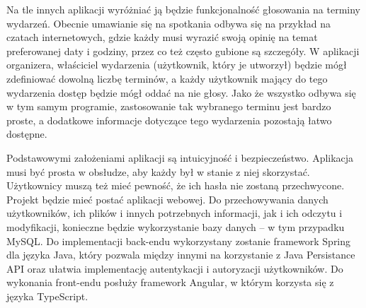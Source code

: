 \documentclass[a4paper,twoside,12pt]{book}
\begin{document}
Na tle innych aplikacji wyróżniać ją będzie funkcjonalność głosowania na terminy wydarzeń. Obecnie umawianie się na spotkania odbywa się na przykład na czatach internetowych, gdzie każdy musi wyrazić swoją opinię na temat preferowanej daty i godziny, przez co też często gubione są szczegóły. W aplikacji organizera, właściciel wydarzenia (użytkownik, który je utworzył) będzie mógł zdefiniować dowolną liczbę terminów, a każdy użytkownik mający do tego wydarzenia dostęp będzie mógł oddać na nie głosy. Jako że wszystko odbywa się w tym samym programie, zastosowanie tak wybranego terminu jest bardzo proste, a dodatkowe informacje dotyczące tego wydarzenia pozostają łatwo dostępne.

Podstawowymi założeniami aplikacji są intuicyjność i bezpieczeństwo. Aplikacja musi być prosta w obsłudze, aby każdy był w stanie z niej skorzystać. Użytkownicy muszą też mieć pewność, że ich hasła nie zostaną przechwycone.
%
Projekt będzie mieć postać aplikacji webowej. Do przechowywania danych użytkowników, ich plików i innych potrzebnych informacji, jak i ich odczytu i modyfikacji, konieczne będzie wykorzystanie bazy danych -- w tym przypadku MySQL. Do implementacji back-endu wykorzystany zostanie framework Spring dla języka Java, który pozwala między innymi na korzystanie z Java Persistance API oraz ułatwia implementację autentykacji i autoryzacji użytkowników. Do wykonania front-endu posłuży framework Angular, w którym korzysta się z języka TypeScript.



\end{document}
